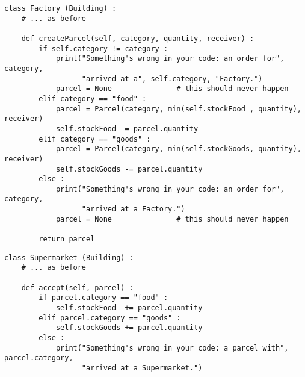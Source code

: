 
\begin{frame}[fragile]
%
\begin{codebox}
\begin{verbatim}
class Factory (Building) :
    # ... as before
    
    def createParcel(self, category, quantity, receiver) :
        if self.category != category :
            print("Something's wrong in your code: an order for", category, 
                  "arrived at a", self.category, "Factory.")
            parcel = None               # this should never happen
        elif category == "food" :
            parcel = Parcel(category, min(self.stockFood , quantity), receiver)
            self.stockFood -= parcel.quantity
        elif category == "goods" :
            parcel = Parcel(category, min(self.stockGoods, quantity), receiver)
            self.stockGoods -= parcel.quantity
        else :
            print("Something's wrong in your code: an order for", category,
                  "arrived at a Factory.")
            parcel = None               # this should never happen
        
        return parcel
\end{verbatim}
\end{codebox}
%
\end{frame}


\begin{frame}[fragile]
%
\begin{codebox}
\begin{verbatim}
class Supermarket (Building) :
    # ... as before
    
    def accept(self, parcel) :
        if parcel.category == "food" :
            self.stockFood  += parcel.quantity
        elif parcel.category == "goods" :
            self.stockGoods += parcel.quantity
        else :
            print("Something's wrong in your code: a parcel with", parcel.category,
                  "arrived at a Supermarket.")
\end{verbatim}
\end{codebox}
%
\end{frame}


